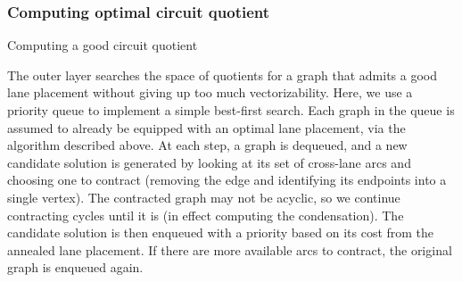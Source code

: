 \subsubsection*{Computing optimal circuit quotient}
\begin{algorithm}[t]


    \caption{Computing a good circuit quotient}\label{alg:circuit-quotient}
\end{algorithm}
The outer layer searches the space of quotients for a graph that admits a good lane placement without giving up too much vectorizability.
Here, we use a priority queue to implement a simple best-first search.
Each graph in the queue is assumed to already be equipped with an optimal lane placement, via the algorithm described above.
At each step, a graph is dequeued, and a new candidate solution is generated by looking at its set of cross-lane arcs and choosing one to contract (removing the edge and identifying its endpoints into a single vertex).
The contracted graph may not be acyclic, so we continue contracting cycles until it is (in effect computing the condensation). %
The candidate solution is then enqueued with a priority based on its cost from the annealed lane placement.
If there are more available arcs to contract, the original graph is enqueued again.

